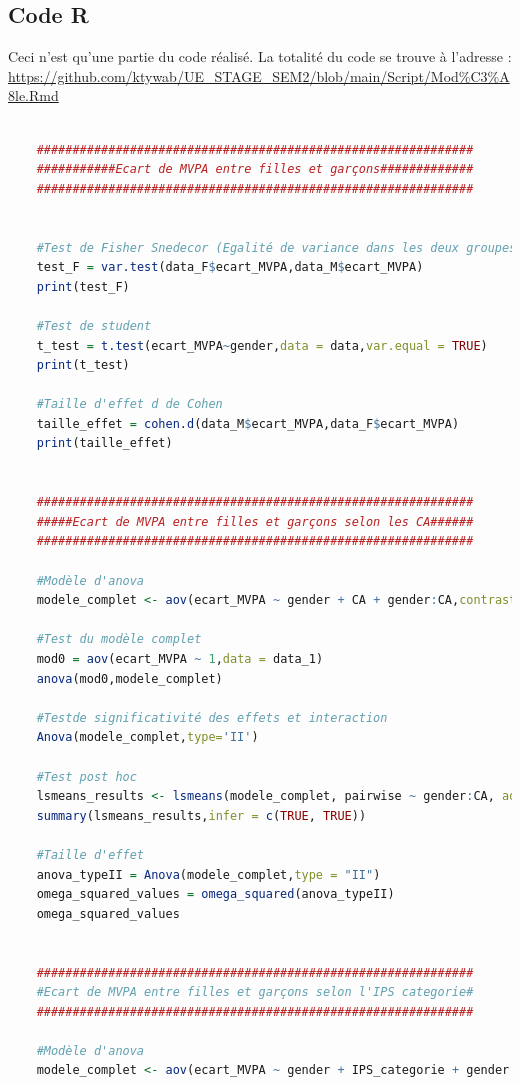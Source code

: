 \documentclass[12pt,a4paper]{article}
\begin{document}
\subsection*{Code R}
Ceci n'est qu'une partie du code réalisé. La totalité du code se trouve à l'adresse : \url{https://github.com/ktywab/UE_STAGE_SEM2/blob/main/Script/Mod%C3%A8le.Rmd}
\begin{lstlisting}[language=R] %ici tu peux mettre du code R c'est pratique (je t'ai mis une fonction à moi en exemple)
	
	############################################################# 
	###########Ecart de MVPA entre filles et garçons#############
	#############################################################
	
	
	#Test de Fisher Snedecor (Egalité de variance dans les deux groupes)
	test_F = var.test(data_F$ecart_MVPA,data_M$ecart_MVPA)
	print(test_F)
	
	#Test de student
	t_test = t.test(ecart_MVPA~gender,data = data,var.equal = TRUE)
	print(t_test)
	
	#Taille d'effet d de Cohen
	taille_effet = cohen.d(data_M$ecart_MVPA,data_F$ecart_MVPA)
	print(taille_effet)
	
	
	############################################################# 
	#####Ecart de MVPA entre filles et garçons selon les CA######
	#############################################################
	
	#Modèle d'anova
	modele_complet <- aov(ecart_MVPA ~ gender + CA + gender:CA,contrasts = list(gender = contr.sum,CA = contr.sum),data = data_1)
	
	#Test du modèle complet
	mod0 = aov(ecart_MVPA ~ 1,data = data_1)
	anova(mod0,modele_complet)
	
	#Testde significativité des effets et interaction
	Anova(modele_complet,type='II')
	
	#Test post hoc
	lsmeans_results <- lsmeans(modele_complet, pairwise ~ gender:CA, adjust='Tukey')
	summary(lsmeans_results,infer = c(TRUE, TRUE)) 
	
	#Taille d'effet
	anova_typeII = Anova(modele_complet,type = "II")
	omega_squared_values = omega_squared(anova_typeII)
	omega_squared_values
	
	
	############################################################# 
	#Ecart de MVPA entre filles et garçons selon l'IPS categorie#
	#############################################################
	
	#Modèle d'anova
	modele_complet <- aov(ecart_MVPA ~ gender + IPS_categorie + gender:IPS_categorie,contrasts = list(gender = contr.sum,IPS_categorie = contr.sum), data = data_2)
	

\end{lstlisting}
\end{document}
